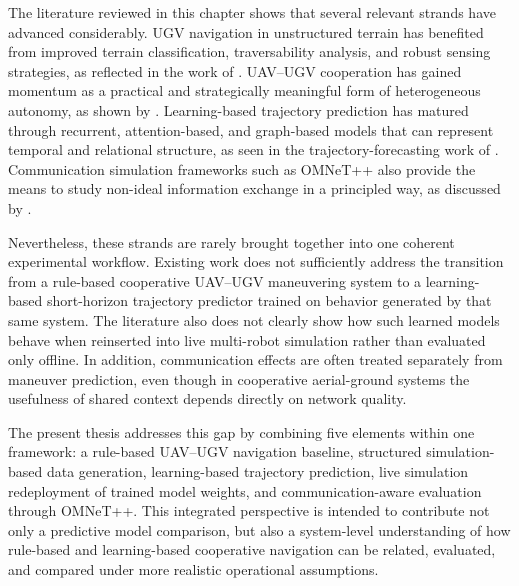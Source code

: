 The literature reviewed in this chapter shows that several relevant strands have advanced considerably. UGV navigation in unstructured terrain has benefited from improved terrain classification, traversability analysis, and robust sensing strategies, as reflected in the work of \citeauthor{chen2021cnn} \citep{chen2021cnn}. UAV--UGV cooperation has gained momentum as a practical and strategically meaningful form of heterogeneous autonomy, as shown by \citeauthor{asadi2020integrated} \citep{asadi2020integrated}. Learning-based trajectory prediction has matured through recurrent, attention-based, and graph-based models that can represent temporal and relational structure, as seen in the trajectory-forecasting work of \citeauthor{giuliari2020transformer} \citep{giuliari2020transformer}. Communication simulation frameworks such as OMNeT++ also provide the means to study non-ideal information exchange in a principled way, as discussed by \citeauthor{varga2008omnet} \citep{varga2008omnet}.

Nevertheless, these strands are rarely brought together into one coherent experimental workflow. Existing work does not sufficiently address the transition from a rule-based cooperative UAV--UGV maneuvering system to a learning-based short-horizon trajectory predictor trained on behavior generated by that same system. The literature also does not clearly show how such learned models behave when reinserted into live multi-robot simulation rather than evaluated only offline. In addition, communication effects are often treated separately from maneuver prediction, even though in cooperative aerial-ground systems the usefulness of shared context depends directly on network quality.

The present thesis addresses this gap by combining five elements within one framework: a rule-based UAV--UGV navigation baseline, structured simulation-based data generation, learning-based trajectory prediction, live simulation redeployment of trained model weights, and communication-aware evaluation through OMNeT++. This integrated perspective is intended to contribute not only a predictive model comparison, but also a system-level understanding of how rule-based and learning-based cooperative navigation can be related, evaluated, and compared under more realistic operational assumptions.
